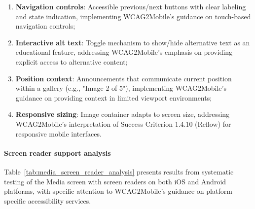 \begin{enumerate}
    \item \textbf{Navigation controls}: Accessible previous/next buttons with clear labeling and state indication, implementing WCAG2Mobile's guidance on touch-based navigation controls;
    
    \item \textbf{Interactive alt text}: Toggle mechanism to show/hide alternative text as an educational feature, addressing WCAG2Mobile's emphasis on providing explicit access to alternative content;
    
    \item \textbf{Position context}: Announcements that communicate current position within a gallery (e.g., "Image 2 of 5"), implementing WCAG2Mobile's guidance on providing context in limited viewport environments;
    
    \item \textbf{Responsive sizing}: Image container adapts to screen size, addressing WCAG2Mobile's interpretation of Success Criterion 1.4.10 (Reflow) for responsive mobile interfaces.
\end{enumerate}

\paragraph{Screen reader support analysis}

Table~\ref{tab:media_screen_reader_analysis} presents results from systematic testing of the Media screen with screen readers on both iOS and Android platforms, with specific attention to WCAG2Mobile's guidance on platform-specific accessibility services.


